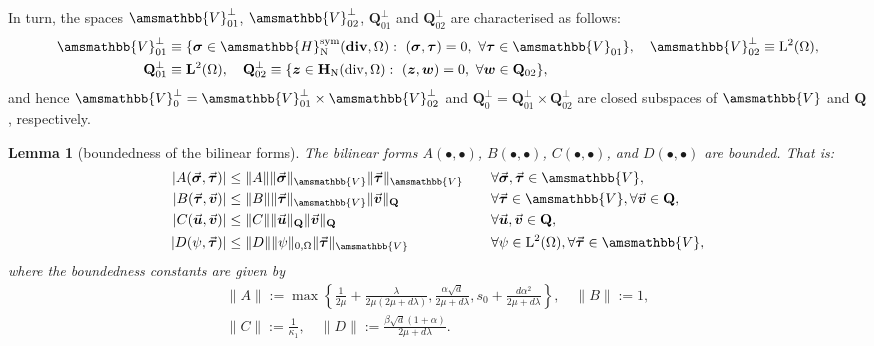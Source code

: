 \documentclass[fleqn,a4paper]{cas-sc}
\newcommand\vdiv{\mathop{\mathrm{div}}\nolimits}
\newcommand\bdiv{\mathop{\mathbf{div}}\nolimits}
\newcommand{\bu}{\boldsymbol{u}}
\newcommand{\bv}{\boldsymbol{v}}
\newcommand{\bw}{\boldsymbol{w}}
\newcommand{\bz}{\boldsymbol{z}}
\newcommand{\bxi}{\boldsymbol{\xi}}
\newcommand{\bzeta}{\boldsymbol{\zeta}}
\newcommand{\0}{\boldsymbol{0}}
\newcommand\bQ{\mathbf{Q}}
\newcommand\bbV{\amsmathbb{V}}
\newcommand\bbH{\amsmathbb{H}}
\newcommand\bH{\mathbf{H}}
\newcommand\bL{\mathbf{L}}
\newcommand\rL{\mathrm{L}}
\newcommand\bZ{\mathbf{Z}}
\newcommand\NN{\mathrm{N}}
\newcommand\bsigma{\boldsymbol{\sigma}}
\newcommand\btau{\boldsymbol{\tau}}
\numberwithin{equation}{section}
\numberwithin{figure}{section}
\newtheorem{lemma}[theorem]{Lemma}
\begin{document}
In turn, the spaces $\bbV_{01}^{\perp}$, $\bbV_{02}^{\perp}$, $\bQ_{01}^{\perp}$ and $\bQ_{02}^{\perp}$ are characterised as follows:
\begin{align*}
    \bbV_{01}^{\perp} &\equiv \{ \bsigma \in \bbH^{\mathrm{sym}}_{\mathrm{N}}(\bdiv,\Omega):\ (\bsigma,\btau) =0 ,\ \forall \btau \in  \bbV_{01}\}, \quad \bbV_{02}^{\perp}\equiv \rL^{2}(\Omega),\\
    \bQ_{01}^{\perp} &\equiv \bL^{2}(\Omega), \quad \bQ_{02}^{\perp} \equiv \{ \bz \in \bH_{\mathrm{N}}(\vdiv,\Omega):\ (\bz,\bw) =0, \ \forall \bw \in  \bQ_{02}\},%
\end{align*}
and hence $\bbV_0^{\perp}= \bbV_{01}^{\perp} \times \bbV_{02}^{\perp}$ and $\bQ_0^{\perp}= \bQ_{01}^{\perp} \times \bQ_{02}^{\perp}$  are closed subspaces of $\bbV$ and $\bQ$, respectively.
\begin{lemma}[boundedness of the bilinear forms]\label{lem:boundedness_bilinear}
The bilinear forms $A(\bullet,\bullet)$, $B(\bullet,\bullet)$, $C(\bullet,\bullet)$, and $D(\bullet,\bullet)$ are bounded. That is:
\begin{align*}
|A(\vec{\bsigma}, \vec{\btau})| &\leq \|A\| \|\vec{\bsigma}\|_{\bbV} \|\vec{\btau}\|_{\bbV} \quad &&\forall \vec{\bsigma}, \vec{\btau} \in \bbV, \\
|B(\vec{\btau}, \vec{\bv})| &\leq \|B\| \|\vec{\btau}\|_{\bbV} \|\vec{\bv}\|_{\bQ} \quad &&\forall \vec{\btau} \in \bbV, \forall \vec{\bv} \in \bQ, \\
|C(\vec{\bu}, \vec{\bv})| &\leq \|C\| \|\vec{\bu}\|_{\bQ} \|\vec{\bv}\|_{\bQ} \quad &&\forall \vec{\bu}, \vec{\bv} \in \bQ, \\
|D(\psi, \vec{\btau})| &\leq \|D\| \|\psi\|_{0,\Omega} \|\vec{\btau}\|_{\bbV} \quad &&\forall \psi \in \rL^2(\Omega), \forall \vec{\btau} \in \bbV, %
\end{align*}
where the boundedness constants are given by
\begin{gather*}
\|A\| := \max\left\{ \frac{1}{2\mu} + \frac{\lambda}{2\mu(2\mu+d\lambda)}, \frac{\alpha\sqrt{d}}{2\mu+d\lambda}, s_0+\frac{d\alpha^2}{2\mu+d\lambda} \right\}, \quad \|B\| := 1, \\ \|C\| := \frac{1}{\kappa_1}, \quad 
\|D\| := \frac{\beta\sqrt{d}(1+\alpha)}{2\mu+d\lambda}.
\end{gather*}
\end{lemma}
\end{document}
